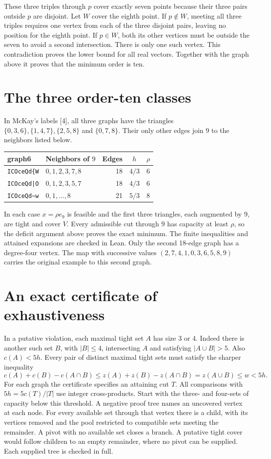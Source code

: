\documentclass[11pt,a4paper]{article}
\newcommand{\cut}{c}
\begin{document}
These three triples through \(p\) cover exactly seven points because their
three pairs outside \(p\) are disjoint. Let \(W\) cover the eighth point.
If \(p\notin W\), meeting all three triples requires one vertex from
each of the three disjoint pairs, leaving no position for the eighth point.
If \(p\in W\), both its other vertices must be outside the seven to avoid
a second intersection. There is only one such vertex. This contradiction
proves the lower bound for all real vectors. Together with the graph
above it proves that the minimum order is ten.

\section*{The three order-ten classes}
In McKay's labels [4], all three graphs have the triangles
\(\{0,3,6\},\{1,4,7\},\{2,5,8\}\) and \(\{0,7,8\}\).
Their only other edges join \(9\) to the neighbors listed below.
\begin{center}
\begin{tabular}{l l r c c}\toprule
graph6 & Neighbors of \(9\) & Edges & \(h\) & \(\rho\)\\ \midrule
\verb!ICOceQd{W! & \(0,1,2,3,7,8\) & 18 & \(4/3\) & 6\\
\verb!ICOceQd|O! & \(0,1,2,3,5,7\) & 18 & \(4/3\) & 6\\
\verb!ICOceQd~w! & \(0,1,\ldots,8\) & 21 & \(5/3\) & 8\\ \bottomrule
\end{tabular}
\end{center}
In each case \(x=\rho e_9\) is feasible and the first three triangles,
each augmented by \(9\), are tight and cover \(V\). Every admissible
cut through \(9\) has capacity at least \(\rho\), so the deficit argument
above proves the exact minimum. The finite inequalities and attained
expansions are checked in Lean. Only the second 18-edge graph has a
degree-four vertex. The map with successive values
\((2,7,4,1,0,3,6,5,8,9)\) carries the original example to this second graph.

\newpage
\section*{An exact certificate of exhaustiveness}
In a putative violation, each maximal tight set \(A\) has size 3 or 4.
Indeed there is another such set \(B\), with \(|B|\le4\), intersecting
\(A\) and satisfying \(|A\cup B|>5\). Also \(\cut(A)<5h\). Every pair
of distinct maximal tight sets must satisfy the sharper inequality
\[
 \cut(A)+\cut(B)-\cut(A\cap B)
 \le z(A)+z(B)-z(A\cap B)=z(A\cup B)\le w<5h .
\]
For each graph the certificate specifies an attaining cut \(T\).
All comparisons with \(5h=5\cut(T)/|T|\) use integer cross-products.
Start with the three- and four-sets of capacity below this threshold.
A negative proof tree names an uncovered vertex at each node. For
every available set through that vertex there is a child, with its
vertices removed and the pool restricted to compatible sets meeting
the remainder. A pivot with no available set closes a branch. A
putative tight cover would follow children to an empty remainder,
where no pivot can be supplied. Each supplied tree is checked in full.
\end{document}
